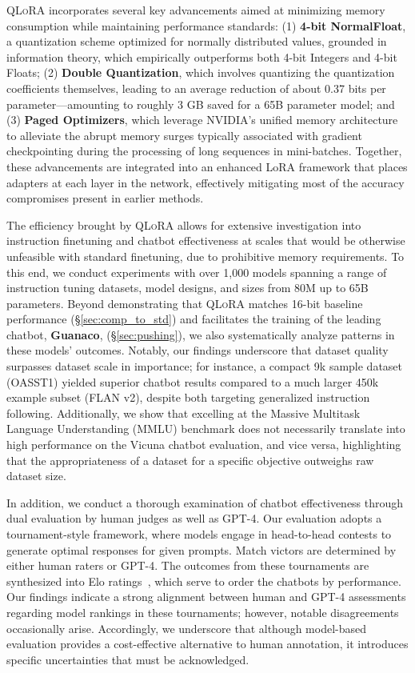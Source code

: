 \textsc{QLoRA} incorporates several key advancements aimed at minimizing memory consumption while maintaining performance standards: (1) \textbf{4-bit NormalFloat}, a quantization scheme optimized for normally distributed values, grounded in information theory, which empirically outperforms both 4-bit Integers and 4-bit Floats; (2) \textbf{Double Quantization}, which involves quantizing the quantization coefficients themselves, leading to an average reduction of about 0.37 bits per parameter—amounting to roughly 3 GB saved for a 65B parameter model; and (3) \textbf{Paged Optimizers}, which leverage NVIDIA’s unified memory architecture to alleviate the abrupt memory surges typically associated with gradient checkpointing during the processing of long sequences in mini-batches. Together, these advancements are integrated into an enhanced LoRA framework that places adapters at each layer in the network, effectively mitigating most of the accuracy compromises present in earlier methods.

The efficiency brought by \textsc{QLoRA} allows for extensive investigation into instruction finetuning and chatbot effectiveness at scales that would be otherwise unfeasible with standard finetuning, due to prohibitive memory requirements. To this end, we conduct experiments with over 1,000 models spanning a range of instruction tuning datasets, model designs, and sizes from 80M up to 65B parameters. Beyond demonstrating that \textsc{QLoRA} matches 16-bit baseline performance (\S\ref{sec:comp_to_std}) and facilitates the training of the leading chatbot, \textbf{Guanaco}, (\S\ref{sec:pushing}), we also systematically analyze patterns in these models’ outcomes. Notably, our findings underscore that dataset quality surpasses dataset scale in importance; for instance, a compact 9k sample dataset (OASST1) yielded superior chatbot results compared to a much larger 450k example subset (FLAN v2), despite both targeting generalized instruction following. Additionally, we show that excelling at the Massive Multitask Language Understanding (MMLU) benchmark does not necessarily translate into high performance on the Vicuna chatbot evaluation, and vice versa, highlighting that the appropriateness of a dataset for a specific objective outweighs raw dataset size.

In addition, we conduct a thorough examination of chatbot effectiveness through dual evaluation by human judges as well as GPT-4. Our evaluation adopts a tournament-style framework, where models engage in head-to-head contests to generate optimal responses for given prompts. Match victors are determined by either human raters or GPT-4. The outcomes from these tournaments are synthesized into Elo ratings~\citep{elo1967proposed, elo1978rating}, which serve to order the chatbots by performance. Our findings indicate a strong alignment between human and GPT-4 assessments regarding model rankings in these tournaments; however, notable disagreements occasionally arise. Accordingly, we underscore that although model-based evaluation provides a cost-effective alternative to human annotation, it introduces specific uncertainties that must be acknowledged.

